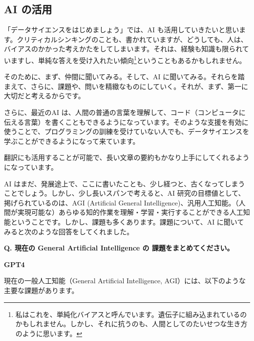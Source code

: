 \documentclass[
  xelatex, ja=standard]{bxjsbook}
\theoremstyle{definition}
\theoremstyle{definition}
\theoremstyle{definition}
\theoremstyle{definition}
\theoremstyle{remark}
\begin{document}
\hypertarget{ai-ux306eux6d3bux7528}{%
\subsection{AI の活用}\label{ai-ux306eux6d3bux7528}}

「データサイエンスをはじめましょう」では、AI も活用していきたいと思います。クリティカルシンキングのことも、書かれていますが、どうしても、人は、バイアスのかかった考えかたをしてしまいます。それは、経験も知識も限られていますし、単純な答えを受け入れたい傾向\footnote{私はこれを、単純化バイアスと呼んでいます。遺伝子に組み込まれているのかもしれません。しかし、それに抗うのも、人間としてのたいせつな生き方のように思います。}ということもあるかもしれません。

そのために、まず、仲間に聞いてみる。そして、AI に聞いてみる。それらを踏まえて、さらに、課題や、問いを精緻なものにしていく。それが、まず、第一に大切だと考えるからです。

さらに、最近のAI は、人間の普通の言葉を理解して、コード（コンピュータに伝える言葉）を書くこともできるようになっています。そのような支援を有効に使うことで、プログラミングの訓練を受けていない人でも、データサイエンスを学ぶことができるようになって来ています。

翻訳にも活用することが可能で、長い文章の要約もかなり上手にしてくれるようになっています。

AI はまだ、発展途上で、ここに書いたことも、少し経つと、古くなってしまうことでしょう。しかし、少し長いスパンで考えると、AI 研究の目標値として、掲げられているのは、AGI (Artificial General Intelligence)、汎用人工知能。（人間が実現可能な）あらゆる知的作業を理解・学習・実行することができる人工知能ということです。しかし、課題も多くあります。課題について、AI に聞いてみると次のような回答をしてくれました。

\textbf{Q. 現在の General Artificial Intelligence の 課題をまとめてください。}

\textbf{GPT4}

現在の一般人工知能（General Artificial Intelligence, AGI）には、以下のような主要な課題があります。
\end{document}
